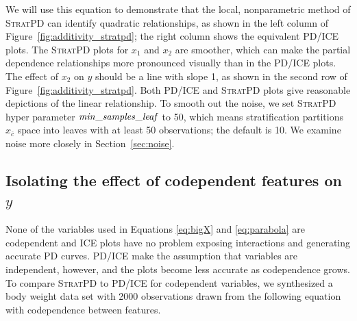 \documentclass[12pt]{article}
\newcommand{\secref}[1]{Section~\ref{#1}}
\newcommand{\figref}[1]{Figure~\ref{#1}}
\newcommand{\spd}{\fontfamily{cmr}\textsc{\small StratPD}}
\newcommand{\xnc}{$x_{\overline{c}}$}
\begin{document}
\noindent We will use this equation to demonstrate that the local, nonparametric method of \spd{} can identify quadratic relationships, as shown in the left column of \figref{fig:additivity_stratpd}; the right column shows the equivalent PD/ICE plots. The \spd{} plots for $x_1$ and $x_2$ are smoother, which can make the partial dependence relationships more pronounced visually than in the PD/ICE plots.  The effect of $x_2$ on $y$ should be a line with slope 1, as shown in the second row of \figref{fig:additivity_stratpd}. Both PD/ICE and \spd{} plots give reasonable depictions of the linear relationship. To smooth out the noise, we set \spd{} hyper parameter ${\it min\_samples\_leaf}$ to 50, which means stratification partitions \xnc{} space into leaves with at least 50 observations; the default is 10. We examine noise more closely in \secref{sec:noise}.

\subsection{Isolating the effect of codependent features on $y$}\label{sec:codep}

None of the variables used in Equations \eqref{eq:bigX} and \eqref{eq:parabola} are codependent and ICE plots have no problem exposing interactions and generating accurate PD curves.  PD/ICE make the assumption that variables are independent, however, and the plots become less accurate as codependence grows.  To compare \spd{} to PD/ICE for codependent variables, we synthesized a body weight data set with 2000 observations drawn from the following equation with codependence between features.
\end{document}
